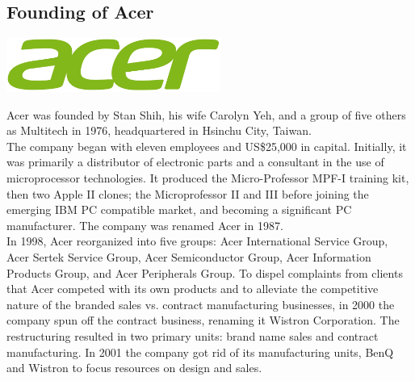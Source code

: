 \documentclass[11pt]{report}
\begin{document}
\subsection{Founding of Acer}
\vspace{2mm}\begin{center}\includegraphics[width=7cm]{./img/acerLogo.jpg}\end{center}
Acer was founded by Stan Shih, his wife Carolyn Yeh, and a group of five others as Multitech in 1976, headquartered in Hsinchu City, Taiwan.\\
\indent The company began with eleven employees and US\$25,000 in capital. Initially, it was primarily a distributor of electronic parts and a consultant in the use of microprocessor technologies. It produced the Micro-Professor MPF-I training kit, then two Apple II clones; the Microprofessor II and III before joining the emerging IBM PC compatible market, and becoming a significant PC manufacturer. The company was renamed Acer in 1987.\\
\indent In 1998, Acer reorganized into five groups: Acer International Service Group, Acer Sertek Service Group, Acer Semiconductor Group, Acer Information Products Group, and Acer Peripherals Group. To dispel complaints from clients that Acer competed with its own products and to alleviate the competitive nature of the branded sales vs. contract manufacturing businesses, in 2000 the company spun off the contract business, renaming it Wistron Corporation. The restructuring resulted in two primary units: brand name sales and contract manufacturing. In 2001 the company got rid of its manufacturing units, BenQ and Wistron to focus resources on design and sales.
\section{}
\end{document}
